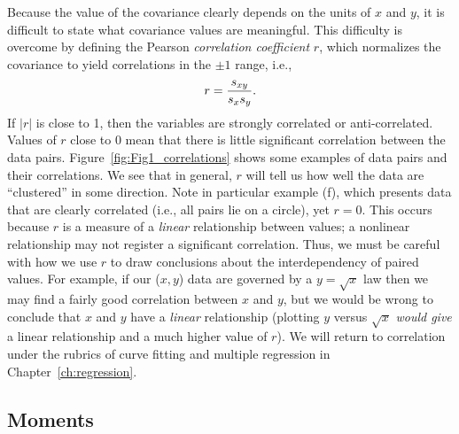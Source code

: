 	Because the value of the covariance clearly depends on the units of $x$ and $y$, it is difficult to 
state what covariance values are meaningful.  This difficulty is overcome by defining the Pearson
\emph{correlation coefficient} $r$, which normalizes the covariance to yield correlations in the $\pm 1$ range, i.e.,
\begin{equation}
	\index{Sample!correlation}
	\index{Correlation}
r = \frac{s_{xy}} {s_x s_y}.
\end{equation}
If $|r|$ is close to 1, then the variables are strongly correlated or anti-correlated.  Values of $r$ close to 0 mean that there 
is little significant correlation between the data pairs.  Figure~\ref{fig:Fig1_correlations} shows some examples of 
data pairs and their correlations.
We see that in general, $r$ will tell us how well the data are ``clustered'' in some direction.  Note in 
particular example (f), which presents data that are clearly correlated (i.e., all pairs lie on a circle), yet $r 
= 0$.  This occurs because $r$ is a measure of a \emph{linear} relationship between values; a nonlinear 
relationship may not register a significant correlation.  Thus, we must be careful with how we use $r$ to draw conclusions 
about the interdependency of paired values.  For example, if our ($x,y$) data are governed by a $y = \sqrt{x}$ law then we 
may find a fairly good correlation between $x$ and $y$, but we would be wrong to conclude that $x$ and $y$ 
have a \emph{linear} relationship (plotting $y$ versus $\sqrt{x}$  \emph{would give} a linear relationship and a much higher 
value of $r$).  We will return to correlation under the rubrics of curve fitting and multiple regression in 
Chapter~\ref{ch:regression}.

\subsection{Moments}

